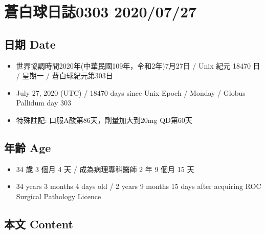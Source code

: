 \documentclass[
]{article}
\providecommand{\tightlist}{%
  \setlength{\itemsep}{0pt}\setlength{\parskip}{0pt}}
\begin{document}
\hypertarget{ux84bcux767dux7403ux65e5ux8a8c0303-20200727}{%
\section{蒼白球日誌0303
2020/07/27}\label{ux84bcux767dux7403ux65e5ux8a8c0303-20200727}}

\hypertarget{ux65e5ux671f-date-26}{%
\subsection{日期 Date}\label{ux65e5ux671f-date-26}}

\begin{itemize}
\tightlist
\item
  世界協調時間2020年(中華民國109年，令和2年)7月27日 / Unix 紀元 18470 日
  / 星期一 / 蒼白球紀元第303日
\item
  July 27, 2020 (UTC) / 18470 days since Unix Epoch / Monday / Globus
  Pallidum day 303
\item
  特殊註記: 口服A酸第86天，劑量加大到20mg QD第60天
\end{itemize}

\hypertarget{ux5e74ux9f61-age-26}{%
\subsection{年齡 Age}\label{ux5e74ux9f61-age-26}}

\begin{itemize}
\tightlist
\item
  34 歲 3 個月 4 天 / 成為病理專科醫師 2 年 9 個月 15 天
\item
  34 years 3 months 4 days old / 2 years 9 months 15 days after
  acquiring ROC Surgical Pathology Licence
\end{itemize}

\hypertarget{ux672cux6587-content-26}{%
\subsection{本文 Content}\label{ux672cux6587-content-26}}
\end{document}
